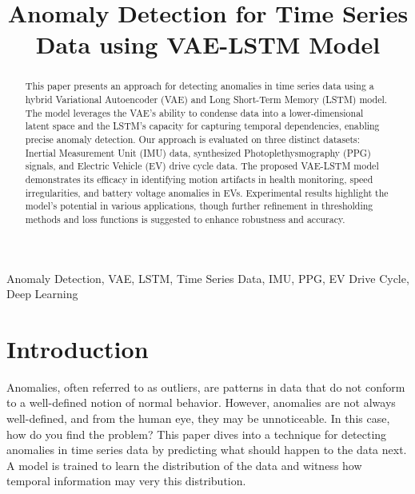 \documentclass[conference]{IEEEtran}
\begin{document}
\title{Anomaly Detection for Time Series Data using VAE-LSTM Model}

\author{
    \and
    \and
}

\maketitle
\thispagestyle{plain}
\pagestyle{plain}

\begin{abstract}
    This paper presents an approach for detecting anomalies in time series data using a hybrid Variational Autoencoder (VAE) and Long Short-Term Memory (LSTM) model. The model leverages the VAE's ability to condense data into a lower-dimensional latent space and the LSTM's capacity for capturing temporal dependencies, enabling precise anomaly detection. Our approach is evaluated on three distinct datasets: Inertial Measurement Unit (IMU) data, synthesized Photoplethysmography (PPG) signals, and Electric Vehicle (EV) drive cycle data. The proposed VAE-LSTM model demonstrates its efficacy in identifying motion artifacts in health monitoring, speed irregularities, and battery voltage anomalies in EVs. Experimental results highlight the model's potential in various applications, though further refinement in thresholding methods and loss functions is suggested to enhance robustness and accuracy.
\end{abstract}

\begin{IEEEkeywords}
Anomaly Detection, VAE, LSTM, Time Series Data, IMU, PPG, EV Drive Cycle, Deep Learning
\end{IEEEkeywords}

\section{Introduction}
Anomalies, often referred to as outliers, are patterns in data that do not conform to a well-defined notion of normal behavior. However, anomalies are not always well-defined, and from the human eye, they may be unnoticeable. In this case, how do you find the problem? This paper dives into a technique for detecting anomalies in time series data by predicting what should happen to the data next. A model is trained to learn the distribution of the data and witness how temporal information may very this distribution.
\end{document}

